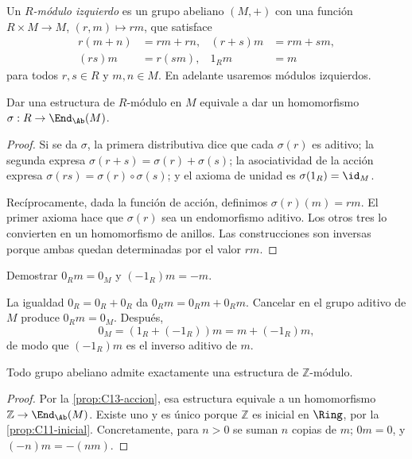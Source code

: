 \begin{defi}
Un \emph{$R$-módulo izquierdo} es un grupo abeliano $(M,+)$ con una función $R\times M\to M$, $(r,m)\mapsto rm$, que satisface
\[
\begin{aligned}
r(m+n)&=rm+rn,&(r+s)m&=rm+sm,\\
(rs)m&=r(sm),&1_Rm&=m
\end{aligned}
\]
para todos $r,s\in R$ y $m,n\in M$. En adelante usaremos módulos izquierdos.
\end{defi}

\begin{prop}\label{prop:C13-accion}
Dar una estructura de $R$-módulo en $M$ equivale a dar un homomorfismo $\sigma:R\to\End_{\Ab}(M)$.
\end{prop}
\begin{proof}
Si se da $\sigma$, la primera distributiva dice que cada $\sigma(r)$ es aditivo; la segunda expresa $\sigma(r+s)=\sigma(r)+\sigma(s)$; la asociatividad de la acción expresa $\sigma(rs)=\sigma(r)\circ\sigma(s)$; y el axioma de unidad es $\sigma(1_R)=\id_M$.

Recíprocamente, dada la función de acción, definimos $\sigma(r)(m)=rm$. El primer axioma hace que $\sigma(r)$ sea un endomorfismo aditivo. Los otros tres lo convierten en un homomorfismo de anillos. Las construcciones son inversas porque ambas quedan determinadas por el valor $rm$.
\end{proof}

\begin{ejer}\label{ejer:C13-cero}
Demostrar $0_Rm=0_M$ y $(-1_R)m=-m$.
\end{ejer}
\begin{sol}
La igualdad $0_R=0_R+0_R$ da $0_Rm=0_Rm+0_Rm$. Cancelar en el grupo aditivo de $M$ produce $0_Rm=0_M$. Después,
\[
0_M=(1_R+(-1_R))m=m+(-1_R)m,
\]
de modo que $(-1_R)m$ es el inverso aditivo de $m$.
\end{sol}

\begin{prop}\label{prop:C13-Zmod}
Todo grupo abeliano admite exactamente una estructura de $\mathbb Z$-módulo.
\end{prop}
\begin{proof}
Por la \cref{prop:C13-accion}, esa estructura equivale a un homomorfismo $\mathbb Z\to\End_{\Ab}(M)$. Existe uno y es único porque $\mathbb Z$ es inicial en $\Ring$, por la \cref{prop:C11-inicial}. Concretamente, para $n>0$ se suman $n$ copias de $m$; $0m=0$, y $(-n)m=-(nm)$.
\end{proof}

